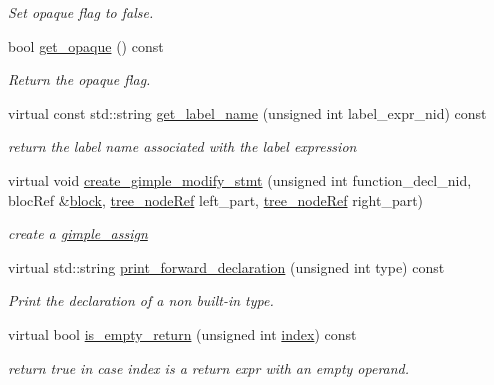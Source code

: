 \begin{DoxyCompactItemize}
\begin{DoxyCompactList}\small\item\em Set opaque flag to false. \end{DoxyCompactList}\item 
bool \hyperlink{classBehavioralHelper_a162faea94bfa7a1de0215fd15013c6e4}{get\+\_\+opaque} () const
\begin{DoxyCompactList}\small\item\em Return the opaque flag. \end{DoxyCompactList}\item 
virtual const std\+::string \hyperlink{classBehavioralHelper_a28996a23af481bdf84e16fe884a596ff}{get\+\_\+label\+\_\+name} (unsigned int label\+\_\+expr\+\_\+nid) const
\begin{DoxyCompactList}\small\item\em return the label name associated with the label expression \end{DoxyCompactList}\item 
virtual void \hyperlink{classBehavioralHelper_a7267b33554b8783cbe44b7b72f2590df}{create\+\_\+gimple\+\_\+modify\+\_\+stmt} (unsigned int function\+\_\+decl\+\_\+nid, bloc\+Ref \&\hyperlink{structblock}{block}, \hyperlink{tree__node_8hpp_a6ee377554d1c4871ad66a337eaa67fd5}{tree\+\_\+node\+Ref} left\+\_\+part, \hyperlink{tree__node_8hpp_a6ee377554d1c4871ad66a337eaa67fd5}{tree\+\_\+node\+Ref} right\+\_\+part)
\begin{DoxyCompactList}\small\item\em create a \hyperlink{structgimple__assign}{gimple\+\_\+assign} \end{DoxyCompactList}\item 
virtual std\+::string \hyperlink{classBehavioralHelper_ab16307b9c784f8fe3940771bc937e611}{print\+\_\+forward\+\_\+declaration} (unsigned int type) const
\begin{DoxyCompactList}\small\item\em Print the declaration of a non built-\/in type. \end{DoxyCompactList}\item 
virtual bool \hyperlink{classBehavioralHelper_aa8b995dc2f276d29354a6c8bd8d6da3d}{is\+\_\+empty\+\_\+return} (unsigned int \hyperlink{tutorial__pact__2019_2Introduction_2third_2include_2Keccak_8h_a028c9bdc8344cca38ab522a337074797}{index}) const
\begin{DoxyCompactList}\small\item\em return true in case index is a return expr with an empty operand. \end{DoxyCompactList}\item 

\end{DoxyCompactItemize}

